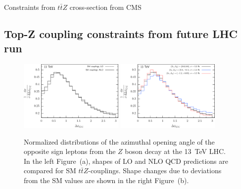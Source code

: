 \documentclass[preprint]{JHEP3} %
\def\ttbZ{t\bar{t}Z}
\begin{document}
Constraints from $t\bar{t}Z$ cross-section from CMS \\

\subsection{Top-Z coupling constraints from future LHC run}


\begin{figure}[t]
\centering %
\includegraphics[width=0.45\textwidth]{./LHC_53_Fig17a.eps}
\hfill
\includegraphics[width=0.45\textwidth]{./LHC_53_Fig17b.eps}
\caption{\label{fig:iii}
Normalized distributions of the azimuthal opening angle of the opposite sign leptons from the $Z$ boson decay at the 13~TeV LHC.
In the left Figure~(a), shapes of LO and NLO QCD predictions are compared for SM $\ttbZ$-couplings.
Shape changes due to deviations from the SM values are shown in the right Figure~(b).
}
\end{figure}
\end{document}
